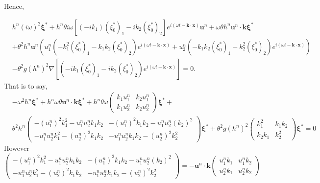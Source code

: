 \documentclass[a4paper, 11pt]{article}
\begin{document}
Hence,

\begin{equation*}
\begin{split}
&h^n(i\omega)^2\boldsymbol{\xi}^*+h^n\theta i\omega\left[(-ik_1)(\xi_0^*)_1-ik_2(\xi_0^*)_2\right]e^{i(\omega t-\boldsymbol{k}\cdot \boldsymbol{x})}\boldsymbol{u}^n+\omega\theta h^n\boldsymbol{u}^n\cdot \boldsymbol{k}\boldsymbol{\xi}^*\\
&+\theta^2 h^n\boldsymbol{u}^n\left(u_1^n\left(-k_1^2(\xi_0^*)_1-k_1k_2(\xi_0^*)_2\right)e^{i(\omega t-\boldsymbol{k}\cdot \boldsymbol{x})}+u_2^n\left(-k_1k_2(\xi_0^*)_1-k_2^2(\xi_0^*)_2\right)e^{i(\omega t-\boldsymbol{k}\cdot \boldsymbol{x})}\right)\\
&-\theta^2g(h^n)^2\nabla\left[(-ik_1(\xi_0^*)_1-ik_2(\xi_0^*)_2)e^{i(\omega t-\boldsymbol{k}\cdot \boldsymbol{x})}\right]=0.
\end{split}
\end{equation*}
That is to say, 
\begin{equation*}
\begin{split}
&-\omega^2h^n\boldsymbol{\xi}^*+h^n\omega \theta\boldsymbol{u}^n\cdot \boldsymbol{k}\boldsymbol{\xi}^*+h^n\theta\omega \begin{pmatrix}k_1u_1^n&k_2u_1^n\\k_1u_2^n&k_2u_2^n\end{pmatrix}\boldsymbol{\xi}^*+\\
&\theta^2 h^n\begin{pmatrix}-(u_1^n)^2k_1^2-u_1^nu_2^nk_1k_2&-(u_1^n)^2k_1k_2-u_1^nu_2^n(k_2)^2\\
-u_1^nu_2^nk_1^2-(u_2^n)^2k_1k_2&-u_1^nu_2^nk_1k_2-(u_2^n)^2k_2^2\end{pmatrix}\boldsymbol{\xi}^*+\theta^2g(h^n)^2\begin{pmatrix}k_1^2&k_1k_2\\k_2k_1&k_2^2\end{pmatrix}\boldsymbol{\xi}^*=0
\end{split}
\end{equation*}
However
\begin{equation*}
\begin{pmatrix}-(u_1^n)^2k_1^2-u_1^nu_2^nk_1k_2&-(u_1^n)^2k_1k_2-u_1^nu_2^n(k_2)^2\\
-u_1^nu_2^nk_1^2-(u_2^n)^2k_1k_2&-u_1^nu_2^nk_1k_2-(u_2^n)^2k_2^2\end{pmatrix}
=-\boldsymbol{u}^n\cdot \boldsymbol{k}\begin{pmatrix}u_1^nk_1&u_1^nk_2\\u_2^nk_1&u_2^nk_2\end{pmatrix}
\end{equation*}
\end{document}
